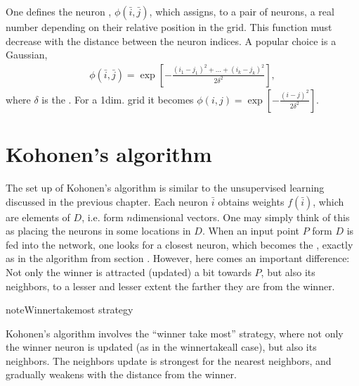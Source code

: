 \documentclass[letterpaper,10pt,english]{jupyterBook}
\begin{document}
\sphinxAtStartPar
One defines the neuron , \(\phi (\bar {i}, \bar {j})\), which assigns, to a pair of neurons, a real number depending on their relative position in the grid. This function must decrease with the distance between the neuron indices. A popular choice is a Gaussian,
\begin{equation*}
\begin{split} \phi(\bar{i}, \bar{j})=\exp\left [ -\frac{(i_1-j_1)^2+...+(i_k-j_k)^2}{2 \delta^2} \right ] ,\end{split}
\end{equation*}
\sphinxAtStartPar
where \(\delta\) is the . For a 1\sphinxhyphen{}dim. grid it becomes \( \phi(i,j)=\exp\left [ -\frac{(i-j)^2}{2 \delta^2} \right ]\).


\section{Kohonen’s algorithm}
\label{\detokenize{docs/som:kohonen-s-algorithm}}
\sphinxAtStartPar
The set up of Kohonen’s algorithm is similar to the unsupervised learning discussed in the previous chapter. Each neuron \(\bar{i}\) obtains weights \(f\left(\bar{i}\right)\), which are elements of \(D\), i.e. form \(n\)\sphinxhyphen{}dimensional vectors. One may simply think of this as placing the neurons in some locations in \(D\). When an input point \(P\) form \(D\) is fed into the network, one looks for a closest neuron, which becomes the , exactly as in the algorithm from section {\hyperref[\detokenize{docs/unsupervised:inn-sec}]{}}. However, here comes an important difference: Not only the winner is attracted (updated) a bit towards \(P\), but also its neighbors, to a lesser and lesser extent the farther they are from the winner.

\begin{sphinxadmonition}{note}{Winner\sphinxhyphen{}take\sphinxhyphen{}most strategy}

\sphinxAtStartPar
Kohonen’s algorithm involves the “winner take most” strategy, where not only the winner neuron is updated (as in the winner\sphinxhyphen{}take\sphinxhyphen{}all case), but also its neighbors. The neighbors update is strongest for the nearest neighbors, and gradually weakens with the distance from the winner.
\end{sphinxadmonition}
\end{document}
